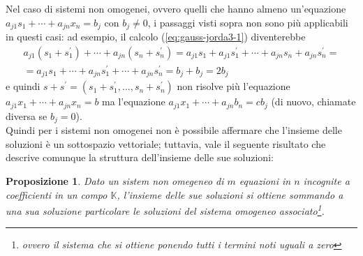 \documentclass{book}
\theoremstyle{definition}
\theoremstyle{plain}
\newtheorem{prop}{Proposizione}[section]
\begin{document}
Nel caso di sistemi non omogenei, ovvero quelli che hanno almeno
un'equazione $a_{j1}s_1+\cdots+a_{jn}x_n=b_j$ con $b_j\neq 0$, i passaggi
visti sopra non sono più applicabili in questi casi: ad esempio, il
calcolo (\ref{eq:gauss-jorda3-1}) diventerebbe
\begin{equation*}
  \begin{matrix}
    a_{j1}(s_1+s_1^\prime)+\cdots+a_{jn}(s_n+s_n^\prime)=a_{j1}s_1+a_{j1}
    s_1^\prime+\cdots+a_{jn}s_n+a_{jn}s_n^\prime=\\
    =a_{j1}s_1+\cdots+a_{jn}s_1^\prime+\cdots+a_{jn}s_n^\prime=b_j+b_j=2b_j
  \end{matrix}
\end{equation*}
e quindi $s+s^\prime=(s_1+s_1^\prime,\dots, s_n+s_n^\prime)$ non risolve più
l'equazione $a_{j1}x_1+\cdots+a_{jn}x_n=b$ ma l'equazione $a_{j1}x_1+\cdots
+a_{jn}b_n=cb_j$ (di nuovo, chiamate diversa se $b_j=0$).\\
Quindi per i sistemi non omogenei non è possibile affermare che l'insieme
delle soluzioni è un sottospazio vettoriale; tuttavia, vale il seguente
risultato che descrive comunque la struttura dell'insieme delle sue
soluzioni:
\begin{prop}
  \label{prop:gauss-jorda4}
  Dato un sistem non omegeneo di $m$ equazioni in $n$ incognite a
  coefficienti in un compo $\mathds{K}$, l'insieme delle sue soluzioni
  si ottiene sommando a una sua soluzione particolare le soluzioni del
  \textit{sistema omogeneo associato}\footnote{ovvero il sistema che si
  ottiene ponendo tutti i termini noti uguali a zero}.
\end{prop}
\end{document}
